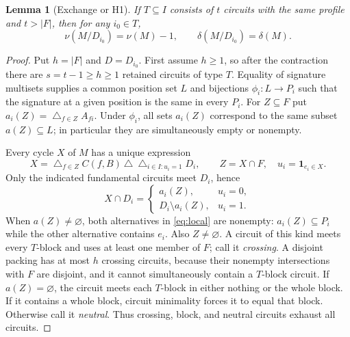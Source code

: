 \documentclass[11pt]{article}
\newtheorem{lemma}[theorem]{Lemma}
\begin{document}
\begin{lemma}[Exchange or H1]\label{lem:exchange}
If $T\subseteq I$ consists of $t$ circuits with the same profile and
$t>|F|$, then for any $i_0\in T$,
\[
 \nu(M/D_{i_0})=\nu(M)-1,
 \qquad \delta(M/D_{i_0})=\delta(M).
\]
\end{lemma}
\begin{proof}
Put $h=|F|$ and $D=D_{i_0}$.  First assume $h\geq1$, so after the
contraction there are $s=t-1\geq h\geq1$ retained circuits of type
$T$.  Equality of signature multisets supplies a common position set
$L$ and bijections $\phi_i:L\to P_i$ such that the signature at a
given position is the same in every $P_i$.  For $Z\subseteq F$ put
$a_i(Z)=\mathop{\triangle}_{f\in Z}A_{fi}$.  Under $\phi_i$, all sets
$a_i(Z)$ correspond to the same subset $a(Z)\subseteq L$; in
particular they are simultaneously empty or nonempty.

Every cycle $X$ of $M$ has a unique expression
\begin{equation}\label{eq:cycleexp}
 X=\mathop{\triangle}_{f\in Z}C(f,B)\ \triangle\
   \mathop{\triangle}_{i\in I:u_i=1}D_i,
 \qquad Z=X\cap F,
 \quad u_i=\mathbf 1_{e_i\in X}.
\end{equation}
Only the indicated fundamental circuits meet $D_i$, hence
\begin{equation}\label{eq:local}
 X\cap D_i=\begin{cases}a_i(Z),&u_i=0,\\
                         D_i\setminus a_i(Z),&u_i=1.
          \end{cases}
\end{equation}
When $a(Z)\ne\varnothing$, both alternatives in
\eqref{eq:local} are nonempty: $a_i(Z)\subseteq P_i$ while the other
alternative contains $e_i$.  Also $Z\ne\varnothing$.  A circuit of
this kind meets every $T$-block and uses at least one member of $F$;
call it \emph{crossing}.  A disjoint packing has at most $h$ crossing
circuits, because their nonempty intersections with $F$ are disjoint,
and it cannot simultaneously contain a $T$-block circuit.  If
$a(Z)=\varnothing$, the circuit meets each $T$-block in either nothing
or the whole block.  If it contains a whole block, circuit minimality
forces it to equal that block.  Otherwise call it \emph{neutral}.
Thus crossing, block, and neutral circuits exhaust all circuits.


\end{proof}
\end{document}
